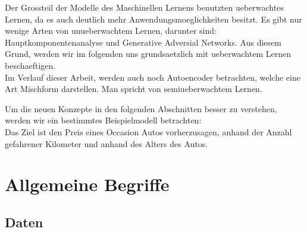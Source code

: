 Der Grossteil der Modelle des Maschinellen Lernens benutzten ueberwachtes
Lernen, da es auch deutlich mehr Anwendungsmoeglichkeiten besitzt. Es gibt nur wenige Arten von
unueberwachtem Lernen, darunter sind: Hauptkomponentenanalyse und Generative
Adversial Networks. Aus diesem Grund, werden wir im folgenden uns grundsaetzlich
mit ueberwachtem Lernen beschaeftigen. \\
Im Verlauf dieser Arbeit, werden auch noch Autoencoder betrachten, welche eine
Art Mischform darstellen. Man spricht von semiueberwachtem Lernen.
\para{}

Um die neuen Konzepte in den folgenden Abschnitten besser zu verstehen, werden
wir ein bestimmtes Beispielmodell betrachten:\\
Das Ziel ist den Preis eines Occasion Autos vorherzusagen, anhand der Anzahl
gefahrener Kilometer und anhand des Alters des Autos.

\para{}
\cite{wiki:supervised_learning}
\cite{wiki:unsupervised_learning}

\section{Allgemeine Begriffe}

\subsection{Daten}

